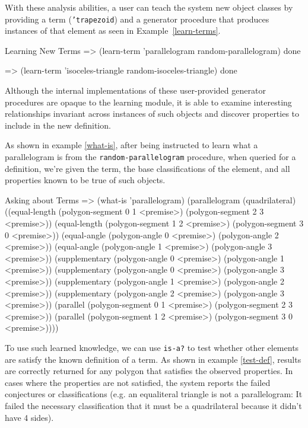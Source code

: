 With these analysis abilities, a user can teach the system new object
classes by providing a term (\texttt{'trapezoid}) and a generator
procedure that produces instances of that element as seen in
Example~\ref{learn-terms}.

\begin{repl-example}
[label=learn-terms]
{Learning New Terms}
=> (learn-term 'parallelogram random-parallelogram)
done

=> (learn-term 'isoceles-triangle random-isoceles-triangle)
done
\end{repl-example}

Although the internal implementations of these user-provided generator
procedures are opaque to the learning module, it is able to examine
interesting relationships invariant across instances of such objects
and discover properties to include in the new definition.

As shown in example \ref{what-is}, after being instructed to learn
what a parallelogram is from the \texttt{random-parallelogram}
procedure, when queried for a definition, we're given the term, the
base classifications of the element, and all properties known to be
true of such objects.

\begin{repl-example}
[label=what-is]
{Asking about Terms}
=> (what-is 'parallelogram)
(parallelogram
 (quadrilateral)
 ((equal-length (polygon-segment 0 1 <premise>)
                (polygon-segment 2 3 <premise>))
  (equal-length (polygon-segment 1 2 <premise>)
                (polygon-segment 3 0 <premise>))
  (equal-angle (polygon-angle 0 <premise>)
               (polygon-angle 2 <premise>))
  (equal-angle (polygon-angle 1 <premise>)
               (polygon-angle 3 <premise>))
  (supplementary (polygon-angle 0 <premise>)
                 (polygon-angle 1 <premise>))
  (supplementary (polygon-angle 0 <premise>)
                 (polygon-angle 3 <premise>))
  (supplementary (polygon-angle 1 <premise>)
                 (polygon-angle 2 <premise>))
  (supplementary (polygon-angle 2 <premise>)
                 (polygon-angle 3 <premise>))
  (parallel (polygon-segment 0 1 <premise>)
            (polygon-segment 2 3 <premise>))
  (parallel (polygon-segment 1 2 <premise>)
            (polygon-segment 3 0 <premise>))))
\end{repl-example}


To use such learned knowledge, we can use \texttt{is-a?} to test
whether other elements are satisfy the known definition of a term. As
shown in example \ref{test-def}, results are correctly returned for
any polygon that satisfies the observed properties. In cases where the
properties are not satisfied, the system reports the failed
conjectures or classifications (e.g. an equaliteral triangle is not a
parallelogram: It failed the necessary classification that it must be
a quadrilateral because it didn't have 4 sides).

